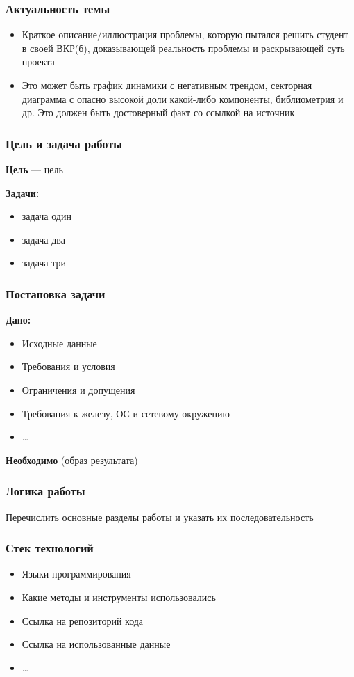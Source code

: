 \documentclass[pdf, hyperref={unicode}, aspectratio=169]{beamer}
\begin{document}
{
\frame{\titlepage}
}

\begin{frame}
\frametitle{Актуальность темы}

\begin{itemize}
	\item Краткое описание/иллюстрация проблемы, которую пытался решить студент в своей ВКР(б), доказывающей реальность проблемы и раскрывающей суть проекта
	\item Это может быть график динамики с негативным трендом, секторная диаграмма с опасно высокой доли какой-либо компоненты, библиометрия и др. Это должен быть достоверный факт со ссылкой на источник
\end{itemize}
\end{frame}


\begin{frame}
\frametitle{Цель и задача работы}

\textbf{Цель} --- \alert{цель}

\textbf{Задачи:}
\begin{itemize}
	\item задача один
	\item задача два
	\item задача три
\end{itemize}
\end{frame}


\begin{frame}
\frametitle{Постановка задачи}

\textbf{Дано:}
\begin{itemize}
	\item Исходные данные
	\item Требования и условия
	\item Ограничения и допущения
	\item Требования к железу, ОС и сетевому окружению
	\item …
\end{itemize}

\textbf{Необходимо} (образ результата)
\end{frame}


\begin{frame}
\frametitle{Логика работы}

Перечислить основные разделы работы и указать их последовательность
\end{frame}


\begin{frame}
\frametitle{Стек технологий}

\begin{itemize}
	\item Языки программирования
	\item Какие методы и инструменты использовались
	\item Ссылка на репозиторий кода
	\item Ссылка на использованные данные
	\item …
\end{itemize}
\end{frame}
\end{document}
